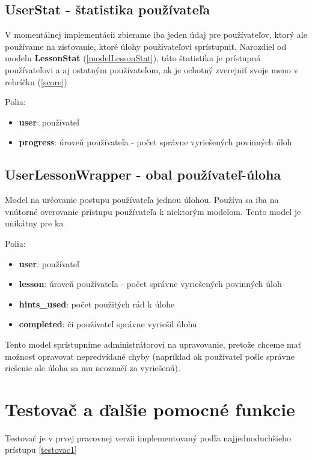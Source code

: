 \subsection{UserStat - štatistika používateľa}
\label{modelUserStat}
V momentálnej implementácii zbierame iba jeden údaj pre používateľov, ktorý ale používame
na zisťovanie, ktoré úlohy používateľovi sprístupniť. Narozdiel od modelu \textbf{LessonStat} (\ref{modelLessonStat}),
táto štatistika je prístupná používateľovi a aj ostatným používateľom, ak je ochotný zverejniť svoje
meno v rebríčku (\ref{score})

Polia:
\begin{itemize}
\item \textbf{user}: používateľ
\item \textbf{progress}: úroveň používateľa - počet správne vyriešených povinných úloh
\end{itemize}

\subsection{UserLessonWrapper - obal používateľ-úloha}
\label{modelWrapper}
Model na určovanie postupu používateľa jednou úlohou. Používa sa iba na vnútorné
overovanie prístupu používateľa k niektorým modelom. Tento model je unikátny pre ka



Polia:
\begin{itemize}
\item \textbf{user}: používateľ
\item \textbf{lesson}: úroveň používateľa - počet správne vyriešených povinných úloh
\item \textbf{hints\_used}: počet použitých rád k úlohe
\item \textbf{completed}: či používateľ správne vyriešil úlohu
\end{itemize}

Tento model sprístupníme administrátorovi na upravovanie, pretože chceme mať možnosť
opravovať nepredvídané chyby (napríklad ak používateľ pošle správne riešenie ale
úloha sa mu neoznačí za vyriešenú).
\newpage
\protect\section{Testovač a ďalšie pomocné funkcie}
Testovač je v prvej pracovnej verzii implementovaný podľa najjednoduchšieho prístupu \ref{testovac1}

